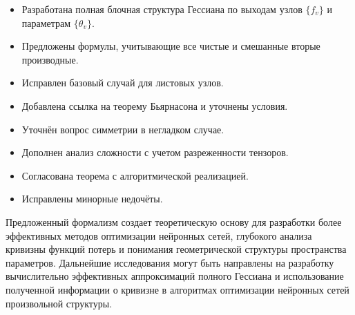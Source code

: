 \documentclass[11pt]{article}
\begin{document}
\begin{itemize}
  \item Разработана полная блочная структура Гессиана по выходам узлов $\{f_v\}$ и параметрам $\{\theta_v\}$.
  \item Предложены формулы, учитывающие все чистые и смешанные вторые производные.
  \item Исправлен базовый случай для листовых узлов.
  \item Добавлена ссылка на теорему Бьярнасона и уточнены условия.
  \item Уточнён вопрос симметрии в негладком случае.
  \item Дополнен анализ сложности с учетом разреженности тензоров.
  \item Согласована теорема с алгоритмической реализацией.
  \item Исправлены минорные недочёты.
\end{itemize}

Предложенный формализм создает теоретическую основу для разработки более эффективных методов оптимизации
нейронных сетей, глубокого анализа кривизны функций потерь и понимания геометрической структуры пространства
параметров. Дальнейшие исследования могут быть направлены на разработку вычислительно эффективных
аппроксимаций полного Гессиана и использование полученной информации о кривизне в алгоритмах оптимизации
нейронных сетей произвольной структуры.
\end{document}

